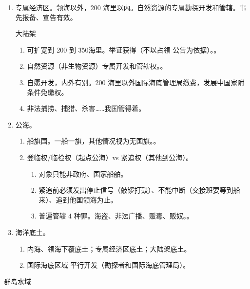 \begin{enumerate}
\begin{enumerate}
\begin{enumerate}
                \end{enumerate}
          \item 专属经济区。领海以外，200 海里以内。自然资源的专属勘探开发和管辖。事先报备、宣告有效。
                \begin{kk}{大陆架}
                  \begin{enumerate}
                    \item 可扩宽到 200 到 350海里。举证获得（不以占领 \hz 公告为依据）。。
                    \item 自然资源（非生物资源）专属开发和管辖权。。
                    \item 自愿开发，内外有别。200 海里以外国际海底管理局缴费，发展中国家附条件免缴权。
                    \item 非法捕捞、捕猎、杀害……我国管得着。
                  \end{enumerate}
                \end{kk}
          \item 公海。
                \begin{enumerate}
                  \item 船旗国。一船一旗，其他情况视为无国旗。。
                  \item 登临权/临检权（起点公海）vs 紧追权（其他到公海）。
                        \begin{enumerate}
                          \item 对象只能非政府、国家船舶。
                          \item 紧追前必须发出停止信号（敲锣打鼓）、不能中断（交接班要等到船来）、追到他国领海为止。
                          \item 普遍管辖 4 种罪。海盗、非法广播、贩毒、贩奴。。
                        \end{enumerate}
                \end{enumerate}
          \item 海洋底土。
                \begin{enumerate}
                  \item 内海、领海下覆底土；专属经济区底土；大陆架底土。
                  \item 国际海底区域 \yjt 平行开发（勘探者和国际海底管理局）。
                \end{enumerate}
        \end{enumerate}
        \begin{kk}{群岛水域}

\end{kk}
\end{enumerate}
